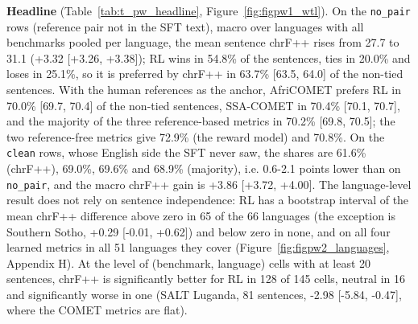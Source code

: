 \textbf{Headline} (Table~\ref{tab:t_pw_headline}, Figure~\ref{fig:figpw1_wtl}). On the \texttt{no\_pair} rows (reference pair not in the SFT text), macro over languages with all benchmarks pooled per language, the mean sentence chrF++ rises from 27.7 to 31.1 (+3.32 {[}+3.26, +3.38{]}); RL wins in 54.8\% of the sentences, ties in 20.0\% and loses in 25.1\%, so it is preferred by chrF++ in 63.7\% {[}63.5, 64.0{]} of the non-tied sentences. With the human references as the anchor, AfriCOMET prefers RL in 70.0\% {[}69.7, 70.4{]} of the non-tied sentences, SSA-COMET in 70.4\% {[}70.1, 70.7{]}, and the majority of the three reference-based metrics in 70.2\% {[}69.8, 70.5{]}; the two reference-free metrics give 72.9\% (the reward model) and 70.8\%. On the \texttt{clean} rows, whose English side the SFT never saw, the shares are 61.6\% (chrF++), 69.0\%, 69.6\% and 68.9\% (majority), i.e. 0.6-2.1 points lower than on \texttt{no\_pair}, and the macro chrF++ gain is +3.86 {[}+3.72, +4.00{]}. The language-level result does not rely on sentence independence: RL has a bootstrap interval of the mean chrF++ difference above zero in 65 of the 66 languages (the exception is Southern Sotho, +0.29 {[}-0.01, +0.62{]}) and below zero in none, and on all four learned metrics in all 51 languages they cover (Figure~\ref{fig:figpw2_languages}, Appendix H). At the level of (benchmark, language) cells with at least 20 sentences, chrF++ is significantly better for RL in 128 of 145 cells, neutral in 16 and significantly worse in one (SALT Luganda, 81 sentences, -2.98 {[}-5.84, -0.47{]}, where the COMET metrics are flat).

